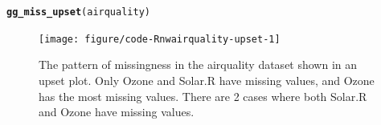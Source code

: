 \documentclass{article}\usepackage[]{graphicx}\usepackage[]{xcolor}
\makeatletter
\newcommand{\hlstd}[1]{\textcolor[rgb]{0.345,0.345,0.345}{#1}}%
\newcommand{\hlkwd}[1]{\textcolor[rgb]{0.737,0.353,0.396}{\textbf{#1}}}%
\newenvironment{kframe}{%
 \def\at@end@of@kframe{}%
 \ifinner\ifhmode%
  \def\at@end@of@kframe{\end{minipage}}%
  \begin{minipage}{\columnwidth}%
 \fi\fi%
 \def\FrameCommand##1{\hskip\@totalleftmargin \hskip-\fboxsep
 \colorbox{shadecolor}{##1}\hskip-\fboxsep
     \hskip-\linewidth \hskip-\@totalleftmargin \hskip\columnwidth}%
 \MakeFramed {\advance\hsize-\width
   \@totalleftmargin\z@ \linewidth\hsize
   \@setminipage}}%
 {\par\unskip\endMakeFramed%
 \at@end@of@kframe}
\newenvironment{knitrout}{}{} %
\makeatother
\begin{document}
\begin{knitrout}
\color{fgcolor}\begin{kframe}
\begin{alltt}
\hlkwd{gg_miss_upset}\hlstd{(airquality)}
\end{alltt}
\end{kframe}\begin{figure}

{\centering \texttt{[image: figure/code-Rnwairquality-upset-1]} 

}

\caption[The pattern of missingness in the airquality dataset shown in an upset plot]{The pattern of missingness in the airquality dataset shown in an upset plot. Only Ozone and Solar.R have missing values, and Ozone has the most missing values. There are 2 cases where both Solar.R and Ozone have missing values.}\label{fig:airquality-upset}
\end{figure}

\end{knitrout}
\end{document}
